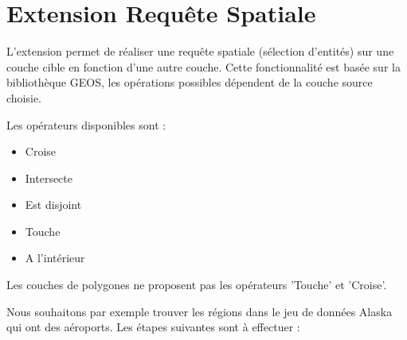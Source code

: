 
\section{Extension Requête Spatiale}\label{sec:spatial_query}


L'extension  permet de réaliser une requête spatiale (sélection d'entités) sur une couche cible en fonction d'une autre couche. Cette fonctionnalité est basée sur la bibliothèque GEOS, les opérations possibles dépendent de la couche source choisie.

Les opérateurs disponibles sont :

\begin{itemize}[label=--]
\item Croise
\item Intersecte
\item Est disjoint
\item Touche
\item A l'intérieur
\end{itemize}

Les couches de polygones ne proposent pas les opérateurs 'Touche' et 'Croise'.


Nous souhaitons par exemple trouver les régions dans le jeu de données Alaska qui ont des aéroports. Les étapes suivantes sont à effectuer :

